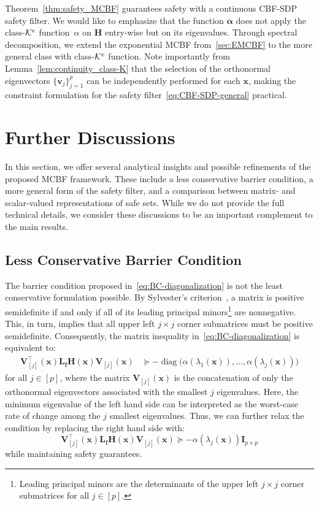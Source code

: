 \documentclass[10pt,twocolumn,twoside]{IEEEtran}
\newcommand{\until}[1]{[#1]}
\newcommand{\Kc}{\mathcal{K}}
\newcommand{\Ke}{\Kc^{\rm e}}
\theoremstyle{definition}
\renewcommand{\bf}{\mathbf{f}} %
\newcommand{\bv}{\mathbf{v}}
\newcommand{\bx}{\mathbf{x}}
\newcommand{\bH}{\mathbf{H}}
\newcommand{\bI}{\mathbf{I}}
\newcommand{\bL}{\mathbf{L}}
\newcommand{\bV}{\mathbf{V}}
\newcommand{\balpha}{\boldsymbol{\alpha}}
\newcommand{\diag}{{\operatorname{diag}}}
\begin{document}
Theorem~\ref{thm:safety_MCBF} guarantees safety with a continuous CBF-SDP safety filter. We would like to emphasize that the function $\balpha$ does not apply the class-$\Ke$ function~$\alpha$ on $\bH$ entry-wise but on its eigenvalues. Through spectral decomposition, we extend the exponential MCBF from~\ref{sec:EMCBF} to the more general class with class-$\Ke$ function. Note importantly from Lemma~\ref{lem:continuity_class-K} that the selection of the orthonormal eigenvectors $\{\bv_j\}_{j=1}^p$ can be independently performed for each $\bx$, making the constraint formulation for the safety filter~\eqref{eq:CBF-SDP-general} practical.

\section{Further Discussions}
In this section, we offer several analytical insights and possible refinements of the proposed MCBF framework. These include a less conservative barrier condition, a more general form of the safety filter, and a comparison between matrix- and scalar-valued representations of safe sets. While we do not provide the full technical details, we consider these discussions to be an important complement to the main results. 


\subsection{Less Conservative Barrier Condition}
The barrier condition proposed in~\eqref{eq:BC-diagonalization} is not the least conservative formulation possible. By Sylvester's criterion~\cite[Thm. 7.2.5]{RAH-CRJ:12}, a matrix is positive semidefinite if and only if all of its leading principal minors\footnote{Leading principal minors are the determinants of the upper left $j\times j$ corner submatrices for all $j\in\until{p}$.} are nonnegative. This, in turn, implies that all upper left $j\times j$ corner submatrices must be positive semidefinite. Consequently, the matrix inequality in~\eqref{eq:BC-diagonalization} is equivalent to:
\begin{align*}
    \bV_{\until{j}}^\top(\bx)\bL_\bf\bH(\bx)\bV_{\until{j}}(\bx) & \succeq -\diag\big(\alpha(\lambda_1(\bx)),\dots,\alpha(\lambda_j(\bx))\big)
\end{align*}
for all $j\in\until{p}$, where the matrix $\bV_{\until{j}}(\bx)$ is the concatenation of only the orthonormal eigenvectors associated with the smallest $j$ eigenvalues. Here, the minimum eigenvalue of the left hand side can be interpreted as the worst-case rate of change among the $j$ smallest eigenvalues. Thus, we can further relax the condition by replacing the right hand side with:
\begin{equation}\label{eq:BC_multiple_LMIs}
    \bV_{\until{j}}^\top(\bx)\bL_\bf\bH(\bx)\bV_{\until{j}}(\bx) \succeq -\alpha(\lambda_j(\bx))\bI_{p\times p}
\end{equation}
while maintaining safety guarantees.
\end{document}
